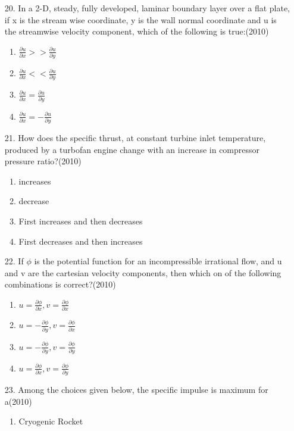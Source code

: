 \documentclass[journal]{IEEEtran}
\begin{document}
\begin{enumerate}
 \item[20.] In a 2-D, steady, fully developed, laminar boundary layer over a flat plate, if x is the stream wise coordinate, y is the wall normal coordinate and u is the streamwise velocity component, which of the following is true:\hfill (2010)
 \begin{enumerate}[label=(\Alph*)]
    \item $\frac{\partial u}{\partial x}>>\frac{\partial u}{\partial y}$
    \item $\frac{\partial u}{\partial x}<<\frac{\partial u}{\partial y}$
    \item $\frac{\partial u}{\partial x}=\frac{\partial u}{\partial y}$
    \item $\frac{\partial u}{\partial x}=-\frac{\partial u}{\partial y}$
 \end{enumerate}
 \item[21.] How does the specific thrust, at constant turbine inlet temperature, produced by a turbofan engine change with an increase in compressor pressure ratio?\hfill (2010)
 \begin{enumerate}[label=(\Alph*)]
    \item increases
    \item decrease
    \item First increases and then decreases
    \item First decreases and then increases
 \end{enumerate}
 \item[22.] If $\phi$ is the potential function for an incompressible irrational flow, and u and v are the cartesian velocity components, then which on of the following combinations is correct?\hfill (2010)
 \begin{enumerate}[label=(\Alph*)]
    \item $u=\frac{\partial \phi}{\partial x}, v=\frac{\partial \phi}{\partial x}$
    \item $u=- \frac{\partial \phi}{\partial y}, v=\frac{\partial \phi}{\partial x}$
    \item $u=- \frac{\partial \phi}{\partial y}, v=\frac{\partial \phi}{\partial y}$
    \item $u=\frac{\partial \phi}{\partial x}, v=\frac{\partial \phi}{\partial y}$
 \end{enumerate}
 \item[23.] Among the choices given below, the specific impulse is maximum for a\hfill (2010) 
 \begin{enumerate}[label=(\Alph*)]
    \item Cryogenic Rocket

\end{enumerate}
\end{enumerate}
\end{document}
